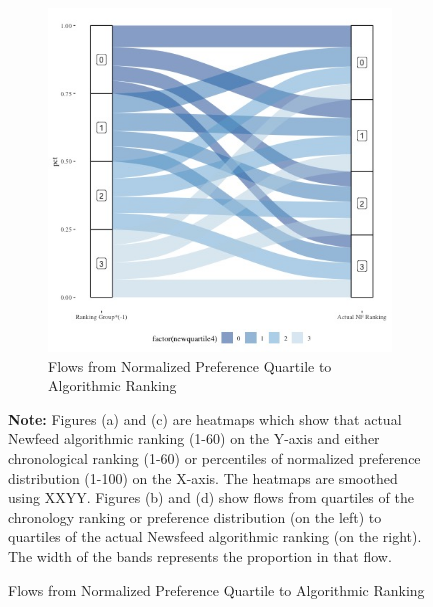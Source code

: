 \documentclass[12pt,letterpaper]{article}
\begin{document}
\begin{figure}[ht]
\begin{subfigure}{.5\textwidth}
        \includegraphics[width=1\linewidth]{Output/Graphs/Audit/Sankey flows/US NF norm quartile to actual.jpg}  
        \caption{Flows from Normalized Preference Quartile to Algorithmic Ranking}
        \label{fig:nfpref_s}
    \end{subfigure}

\footnotesize \textbf{Note:} Figures (a) and (c) are heatmaps which show that actual Newfeed algorithmic ranking (1-60) on the Y-axis and either chronological ranking (1-60)  or percentiles of normalized preference distribution (1-100) on the X-axis. The heatmaps are smoothed using XXYY. Figures (b) and (d) show flows from quartiles of the chronology ranking or preference distribution (on the left) to quartiles of the actual Newsfeed algorithmic ranking (on the right). The width of the bands represents the proportion in that flow.
\end{figure}
\end{document}
